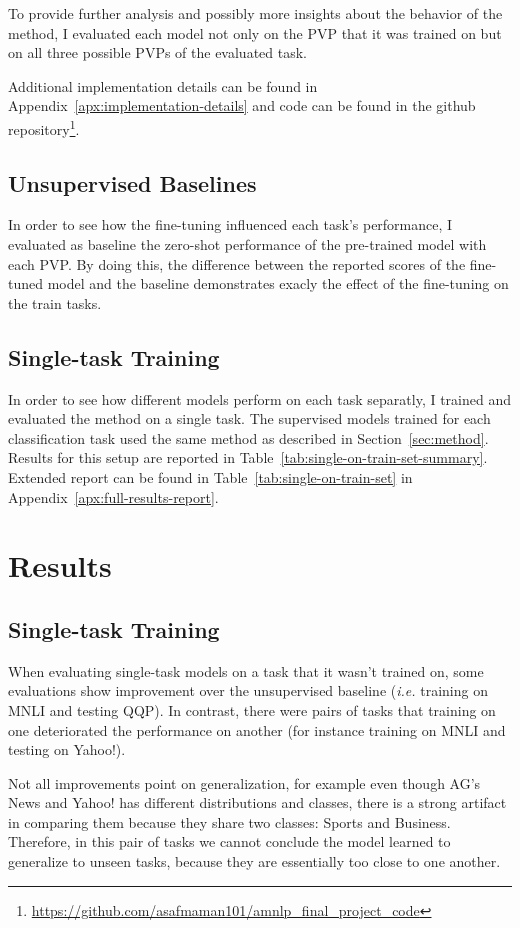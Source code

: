\documentclass[11pt,a4paper]{article}
\begin{document}
To provide further analysis and possibly more insights about the behavior of the method, I evaluated each model not only on the PVP that it was trained on but on all three possible PVPs of the evaluated task.

Additional implementation details can be found in Appendix~\ref{apx:implementation-details} and code can be found in the github repository\footnote{\url{https://github.com/asafmaman101/amnlp_final_project_code}}.

\subsection{Unsupervised Baselines}
In order to see how the fine-tuning influenced each task's performance, I evaluated as baseline the zero-shot performance of the pre-trained model with each PVP.
By doing this, the difference between the reported scores of the fine-tuned model and the baseline demonstrates exacly the effect of the fine-tuning on the train tasks.

\subsection{Single-task Training}
In order to see how different models perform on each task separatly, I trained and evaluated the method on a single task.
The supervised models trained for each classification task used the same method as described in Section~\ref{sec:method}.
Results for this setup are reported in Table~\ref{tab:single-on-train-set-summary}.
Extended report can be found in Table~\ref{tab:single-on-train-set} in Appendix~\ref{apx:full-results-report}.

\section{Results}
\subsection*{Single-task Training}
When evaluating single-task models on a task that it wasn't trained on, some evaluations show improvement over the unsupervised baseline (\textit{i.e.} training on MNLI and testing QQP).
In contrast, there were pairs of tasks that training on one deteriorated the performance on another (for instance training on MNLI and testing on Yahoo!).

Not all improvements point on generalization, for example even though AG's News and Yahoo! has different distributions and classes, there is a strong artifact in comparing them because they share two classes: Sports and Business.
Therefore, in this pair of tasks we cannot conclude the model learned to generalize to unseen tasks, because they are essentially too close to one another.
\end{document}
